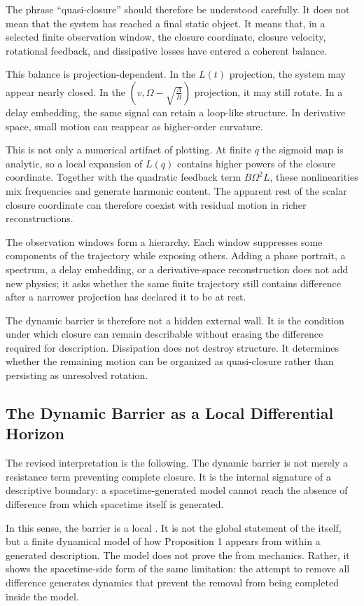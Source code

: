 The phrase ``quasi-closure'' should therefore be understood carefully.
It does not mean that the system has reached a final static object.
It means that, in a selected finite observation window,
the closure coordinate, closure velocity, rotational feedback,
and dissipative losses have entered a coherent balance.

This balance is projection-dependent.
In the $L(t)$ projection, the system may appear nearly closed.
In the $(v,\Omega-\sqrt{\frac{A}{B}})$ projection, it may still rotate.
In a delay embedding, the same signal can retain a loop-like structure.
In derivative space, small motion can reappear as higher-order
curvature.

This is not only a numerical artifact of plotting.
At finite $q$ the sigmoid map is analytic,
so a local expansion of $L(q)$ contains higher powers of the closure
coordinate.
Together with the quadratic feedback term $B\Omega^2L$,
these nonlinearities mix frequencies and generate harmonic content.
The apparent rest of the scalar closure coordinate can therefore
coexist with residual motion in richer reconstructions.

The observation windows form a hierarchy.
Each window suppresses some components of the trajectory while exposing
others.
Adding a phase portrait, a spectrum, a delay embedding,
or a derivative-space reconstruction does not add new physics;
it asks whether the same finite trajectory still contains difference
after a narrower projection has declared it to be at rest.

The dynamic barrier is therefore not a hidden external wall.
It is the condition under which closure can remain describable without
erasing the difference required for description.
Dissipation does not destroy structure.
It determines whether the remaining motion can be organized as
quasi-closure rather than persisting as unresolved rotation.

\subsection{The Dynamic Barrier as a Local Differential Horizon}

The revised interpretation is the following.
The dynamic barrier is not merely a resistance term preventing complete
closure.
It is the internal signature of a descriptive boundary:
a spacetime-generated model cannot reach the absence of difference
from which spacetime itself is generated.

In this sense, the barrier is a local \DH{}.
It is not the global statement of the \DHP{} itself,
but a finite dynamical model of how Proposition 1 appears from within
a generated description.
The model does not prove the \DHP{} from mechanics.
Rather, it shows the spacetime-side form of the same limitation:
the attempt to remove all difference generates dynamics that prevent
the removal from being completed inside the model.

